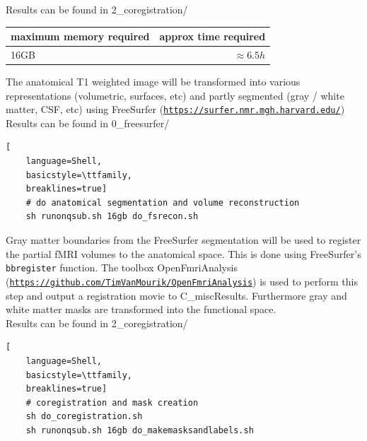 \documentclass[12pt,a4paper]{scrartcl}
\begin{document}
\noindent Results can be found in 2\_coregistration/\\
\begin{table}[h]
\begin{tabular}{l | r}
\toprule
maximum memory required & approx time required\\\toprule
16GB & $\approx 6.5h$ \\\bottomrule
\end{tabular}
\end{table}
\FloatBarrier
\noindent The anatomical T1 weighted image will be transformed into various representations (volumetric, surfaces, etc) and partly segmented (gray / white matter, CSF, etc) using FreeSurfer (\href{https://surfer.nmr.mgh.harvard.edu/}{\nolinkurl{https://surfer.nmr.mgh.harvard.edu/}})\\

\noindent Results can be found in 0\_freesurfer/\\
\begin{lstlisting}[
    language=Shell,
    basicstyle=\ttfamily,
    breaklines=true]
    # do anatomical segmentation and volume reconstruction
    sh runonqsub.sh 16gb do_fsrecon.sh
\end{lstlisting}
Gray matter boundaries from the FreeSurfer segmentation will be used to register the partial fMRI volumes to the anatomical space. This is done using FreeSurfer's \texttt{bbregister} function. The toolbox OpenFmriAnalysis (\href{https://github.com/TimVanMourik/OpenFmriAnalysis}{\nolinkurl{https://github.com/TimVanMourik/OpenFmriAnalysis}}) is used to perform this step and output a registration movie to C\_miscResults. Furthermore gray and white matter masks are transformed into the functional space.\\

\noindent Results can be found in 2\_coregistration/\\
\begin{lstlisting}[
    language=Shell,
    basicstyle=\ttfamily,
    breaklines=true]
    # coregistration and mask creation
    sh do_coregistration.sh
    sh runonqsub.sh 16gb do_makemasksandlabels.sh
\end{lstlisting}
\end{document}
